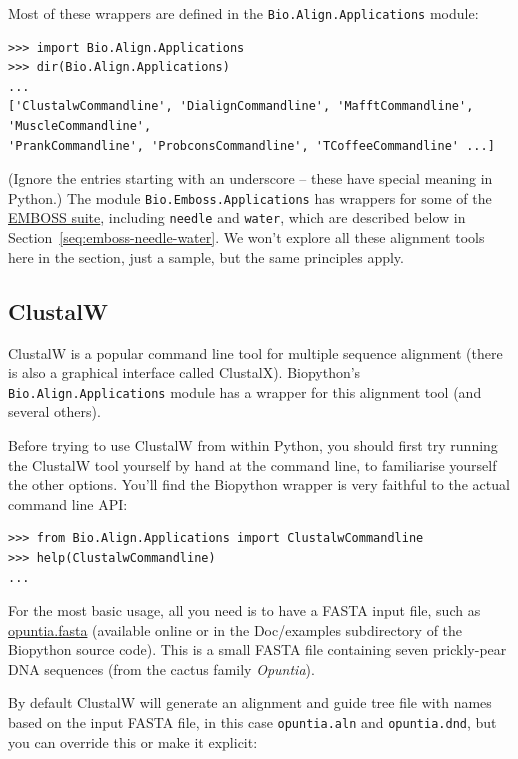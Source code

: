 \documentclass{report}
\begin{document}
Most of these wrappers are defined in the \verb|Bio.Align.Applications| module:

\begin{verbatim}
>>> import Bio.Align.Applications
>>> dir(Bio.Align.Applications)
...
['ClustalwCommandline', 'DialignCommandline', 'MafftCommandline', 'MuscleCommandline',
'PrankCommandline', 'ProbconsCommandline', 'TCoffeeCommandline' ...]
\end{verbatim}

\noindent (Ignore the entries starting with an underscore -- these have
special meaning in Python.)
The module \verb|Bio.Emboss.Applications| has wrappers for some of the
\href{http://emboss.sourceforge.net/}{EMBOSS suite}, including
\texttt{needle} and \texttt{water}, which are described below in
Section~\ref{seq:emboss-needle-water}.
We won't explore all these alignment tools here in the section, just a
sample, but the same principles apply.

\subsection{ClustalW}
\label{sec:align_clustal}
ClustalW is a popular command line tool for multiple sequence alignment
(there is also a graphical interface called ClustalX). Biopython's
\verb|Bio.Align.Applications| module has a wrapper for this alignment tool
(and several others).

Before trying to use ClustalW from within Python, you should first try running
the ClustalW tool yourself by hand at the command line, to familiarise
yourself the other options. You'll find the Biopython wrapper is very
faithful to the actual command line API:

\begin{verbatim}
>>> from Bio.Align.Applications import ClustalwCommandline
>>> help(ClustalwCommandline)
...
\end{verbatim}

For the most basic usage, all you need is to have a FASTA input file, such as
\href{http://biopython.org/DIST/docs/tutorial/examples/opuntia.fasta}{opuntia.fasta}
(available online or in the Doc/examples subdirectory of the Biopython source
code). This is a small FASTA file containing seven prickly-pear DNA sequences
(from the cactus family \textit{Opuntia}).

By default ClustalW will generate an alignment and guide tree file with names
based on the input FASTA file, in this case \texttt{opuntia.aln} and
\texttt{opuntia.dnd}, but you can override this or make it explicit:
\end{document}
